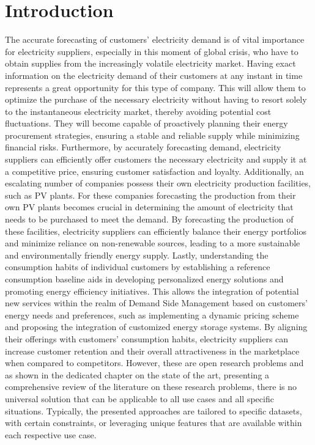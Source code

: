 \chapter{Introduction}
\label{cha:introduction}
\vspace{0.4 cm}

The accurate forecasting of customers' electricity demand is of vital importance for electricity suppliers, especially in this moment of global crisis, who have to obtain supplies from the increasingly volatile electricity market.
Having exact information on the electricity demand of their customers at any instant in time represents a great opportunity for this type of company.
This will allow them to optimize the purchase of the necessary electricity without having to resort solely to the instantaneous electricity market, thereby avoiding potential cost fluctuations.
They will become capable of proactively planning their energy procurement strategies, ensuring a stable and reliable supply while minimizing financial risks.
Furthermore, by accurately forecasting demand, electricity suppliers can efficiently offer customers the necessary electricity and supply it at a competitive price, ensuring customer satisfaction and loyalty.
Additionally, an escalating number of companies possess their own electricity production facilities, such as PV plants.
For these companies forecasting the production from their own PV plants becomes crucial in determining the amount of electricity that needs to be purchased to meet the demand.
By forecasting the production of these facilities, electricity suppliers can efficiently balance their energy portfolios and minimize reliance on non-renewable sources, leading to a more sustainable and environmentally friendly energy supply.
Lastly, understanding the consumption habits of individual customers by establishing a reference consumption baseline aids in developing personalized energy solutions and promoting energy efficiency initiatives.
This allows the integration of potential new services within the realm of Demand Side Management based on customers' energy needs and preferences, such as implementing a dynamic pricing scheme and proposing the integration of customized energy storage systems.
By aligning their offerings with customers' consumption habits, electricity suppliers can increase customer retention and their overall attractiveness in the marketplace when compared to competitors.
However, these are open research problems and as shown in the dedicated chapter on the state of the art, presenting a comprehensive review of the literature on these research problems, there is no universal solution that can be applicable to all use cases and all specific situations.
Typically, the presented approaches are tailored to specific datasets, with certain constraints, or leveraging unique features that are available within each respective use case.

